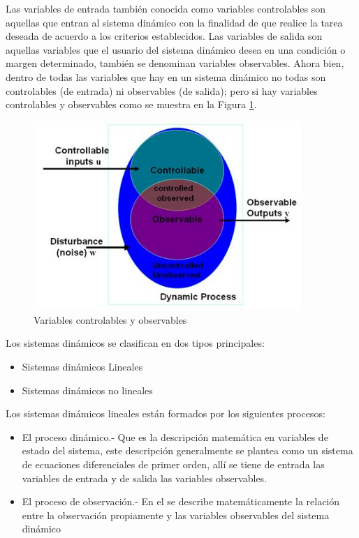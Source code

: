 \documentclass[12pt]{book}
\theoremstyle{definition}
\theoremstyle{remark}
\theoremstyle{plain}
\begin{document}
Las variables de entrada también conocida como variables controlables son aquellas que entran al sistema dinámico con la finalidad de que realice la tarea deseada de acuerdo a los criterios establecidos. Las variables de salida son aquellas variables que el usuario del sistema dinámico desea en una condición o margen determinado, también se denominan variables observables. Ahora bien, dentro de todas las variables que hay en un sistema dinámico no todas son controlables (de entrada) ni observables (de salida); pero si hay variables controlables y observables como se muestra en la Figura \ref{fig007}.

\begin{figure}
\centering
\includegraphics[width=4in]{observables.jpg}
\caption{Variables controlables y observables}
\label{fig007}
\end{figure}

Los sistemas dinámicos se clasifican en dos tipos principales:
\begin{itemize}
\item Sistemas dinámicos Lineales
\item Sistemas dinámicos no lineales
\end{itemize}

Los sistemas dinámicos lineales están formados por los siguientes procesos:
\begin{itemize}
\item El proceso dinámico.- Que es la descripción matemática en variables de estado del sistema, este descripción generalmente se plantea como un sistema de ecuaciones diferenciales de primer orden, allí se tiene de entrada las variables de entrada y de salida las variables observables.
\item El proceso de observación.- En el se describe matemáticamente la relación entre la observación propiamente y las variables observables del sistema dinámico
\end{itemize}
\end{document}
